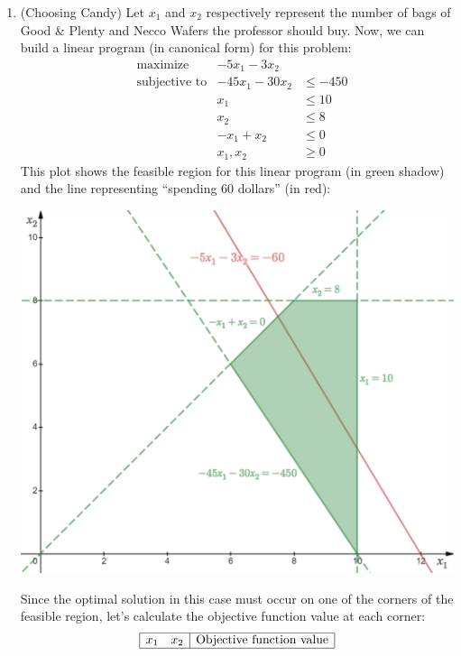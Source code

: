 \documentclass{article}
\begin{document}
\begin{enumerate}

  \item (Choosing Candy)
    Let $x_1$ and $x_2$ respectively represent the number of bags of Good \& Plenty and Necco Wafers the professor should buy. Now, we can build a linear program (in canonical form) for this problem:
    $$
      \begin{aligned}
         & \text{maximize}      & -5x_1 - 3x_2              \\
         & \text{subjective to} & -45x_1 - 30x_2 & \le -450 \\
         &                      & x_1            & \le 10   \\
         &                      & x_2            & \le 8    \\
         &                      & -x_1 + x_2     & \le 0    \\
         &                      & x_1, x_2       & \ge 0
      \end{aligned}
    $$
    This plot shows the feasible region for this linear program (in green shadow) and the line representing ``spending 60 dollars'' (in red):
    \begin{center}
      \href{https://www.desmos.com/calculator/amudvktrfc}{\includegraphics[width=0.75\linewidth]{images/q1b_1.png}}
    \end{center}
    Since the optimal solution in this case must occur on one of the corners of the feasible region, let's calculate the objective function value at each corner:
    $$
      \begin{array}{|cc|c|}
        \hline
        x_1 & x_2 & \text{Objective function value} \\
        \hline

\end{array}$$
\end{enumerate}
\end{document}
